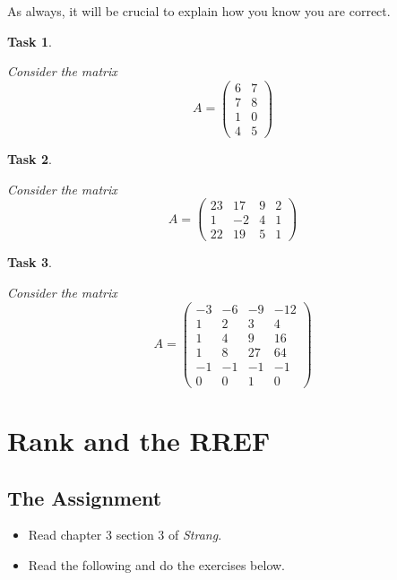 \documentclass[10pt,]{book}
\theoremstyle{plain}
\numberwithin{equation}{section}
\newtheorem{task}{Task}[chapter]
\begin{document}
      As always, it will be crucial to explain how you know you are correct.
\begin{task}
\label{task-91}

        Consider the matrix
        \[
          A = \begin{pmatrix}
          6 & 7 \\
          7 & 8 \\
          1 & 0 \\
          4 & 5
          \end{pmatrix}
        \]\end{task}
\begin{task}
\label{task-92}

        Consider the matrix
        \[
          A = \begin{pmatrix}
          23 & 17 & 9 & 2 \\
          1 & -2 & 4 & 1 \\
          22 & 19 & 5 & 1
          \end{pmatrix}
        \]\end{task}
\begin{task}
\label{task-93}

        Consider the matrix
        \[
          A = \begin{pmatrix}
          -3 & -6 & -9 & -12 \\
          1 & 2 & 3 & 4 \\
          1 & 4 & 9 & 16 \\
          1 & 8 & 27 & 64 \\
          -1 & -1 & -1 & -1 \\
          0 & 0 & 1 & 0
          \end{pmatrix}
        \]\end{task}
\clearpage
\typeout{************************************************}
\typeout{************************************************}
\section[Rank and the RREF]{Rank and the RREF}\label{rank}
\typeout{************************************************}
\typeout{************************************************}
\subsection[The Assignment]{The Assignment}\label{subsection-68}
\begin{itemize}
\item{}Read chapter 3 section 3 of \emph{Strang}.\item{}Read the following and do the exercises below.\end{itemize}
\typeout{************************************************}
\typeout{************************************************}
\end{document}
